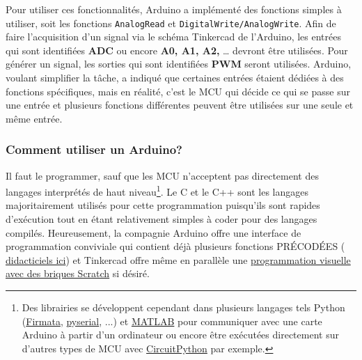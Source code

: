 \documentclass[english,french,12pt]{article}
\begin{document}
 Pour utiliser ces fonctionnalités, Arduino a implémenté des fonctions simples à utiliser, soit les fonctions \texttt{AnalogRead}  et \texttt{DigitalWrite/AnalogWrite}. Afin de faire l’acquisition d’un signal via le schéma Tinkercad de l’Arduino, les entrées qui sont identifiées \textbf{ADC} ou encore \textbf{A0, A1, A2,} … devront être utilisées. Pour générer un signal, les sorties qui sont identifiées \textbf{PWM} seront utilisées. Arduino, voulant simplifier la tâche, a indiqué que certaines entrées étaient dédiées à des fonctions spécifiques, mais en réalité, c’est le MCU qui décide ce qui se passe sur une entrée et plusieurs fonctions différentes peuvent être utilisées sur une seule et même entrée.
 
\subsubsection*{Comment utiliser un Arduino?}
Il faut le programmer, sauf que les MCU n'acceptent pas directement des langages interprétés de haut niveau\footnote{Des librairies se développent cependant dans plusieurs langages tels Python (\href{https://github.com/tino/pyFirmata}{Firmata}, \href{https://pypi.org/project/pyserial/}{pyserial}, ...) et \href{https://www.mathworks.com/help/supportpkg/arduinoio/examples/getting-started-with-matlab-support-package-for-arduino-hardware.html}{MATLAB} pour communiquer avec une carte Arduino à partir d'un ordinateur ou encore être exécutées directement sur d'autres types de MCU avec \href{https://www.digikey.ca/en/maker/blogs/2018/python-on-hardware}{CircuitPython} par exemple.}. Le C et le C++ sont les langages majoritairement utilisés pour cette programmation puisqu’ils sont rapides d’exécution tout en étant relativement simples à coder pour des langages compilés. Heureusement, la compagnie Arduino offre une interface de programmation conviviale qui contient déjà plusieurs fonctions PRÉCODÉES (\href{https://www.arduino.cc/en/Tutorial/BuiltInExamples}{
didacticiels ici}) et Tinkercad offre même en parallèle une \href{https://scientiffic.medium.com/tinkercad-circuits-code-blocks-9953d47b5a3f}{programmation visuelle avec des briques Scratch} si désiré. 
\end{document}
